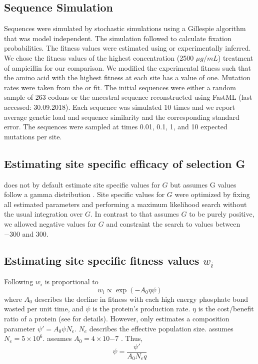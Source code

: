 \subsection{Sequence Simulation}

Sequences were simulated by stochastic simulations using a Gillespie algorithm \citep{gillespie1976} that was model independent.
The simulation followed \citet{SellaAndHirsh2005} to calculate fixation probabilities.
The fitness values were estimated using \selac or experimentally inferred.
We chose the fitness values of the highest concentration (2500 $\mu g/mL$) treatment of ampicillin for our comparison.
We modified the experimental fitness such that the amino acid with the highest fitness at each site has a value of one.
Mutation rates were taken from the \selac or \selacDMS fit.
The initial sequences were either a random sample of 263 codons or the ancestral sequence reconstructed using FastML \citep{fastml} (last accessed: 30.09.2018).
Each sequence was simulated 10 times and we report average genetic load and sequence similarity and the corresponding standard error.
The sequences were sampled at times 0.01, 0.1, 1, and 10 expected mutations per site.

\subsection{Estimating site specific efficacy of selection G}

\selac does not by default estimate site specific values for $G$ but assumes G values follow a gamma distribution \citep{Felsenstein2001}.
Site specific values for $G$ were optimized by fixing all estimated parameters and performing a maximum likelihood search without the usual integration over $G$.
In contrast to \selac that assumes $G$ to be purely positive, we allowed negative values for $G$ and constraint the search to values between $-300$ and $300$.

\subsection{Estimating site specific fitness values $w_i$}

Following \citet{beaulieu2018} $w_i$ is proportional to
\begin{equation}
w_i \propto \exp(-A_0\eta\psi)
\end{equation}
where $A_0$ describes the decline in fitness with each high energy phosphate bond wasted per unit time, and $\psi$ is the protein's production rate.
$\eta$ is the cost/benefit ratio of a protein (see \citep{beaulieu2018} for details). 
However, \selac only estimates a composition parameter $\psi' = A_0\psi N_e$.
$N_e$ describes the effective population size.
\selac assumes $N_e = 5\times 10^6$.
\selac assumes $A_0 = 4 \times 10{-7}$ \citep{gilchrist2007}.
Thus, 
\begin{equation}
\psi = \frac{\psi'}{A_0N_eq}
\end{equation}


